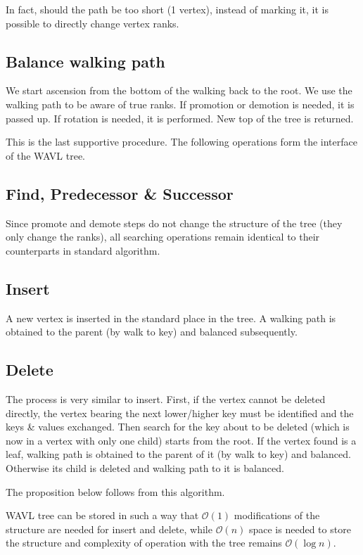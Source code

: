 In fact, should the path be too short (1 vertex), instead of marking it, it is possible to directly change vertex ranks.

\subsection{Balance walking path}

We start ascension from the bottom of the walking back to the root. We use the walking path to be aware of true ranks. If promotion or demotion is needed, it is passed up. If rotation is needed, it is performed. New top of the tree is returned. 

This is the last supportive procedure. The following operations form the interface of the WAVL tree.

\subsection{Find, Predecessor \& Successor}

Since promote and demote steps do not change the structure of the tree (they only change the ranks), all searching operations remain identical to their counterparts in standard algorithm.

\subsection{Insert}

A new vertex is inserted in the standard place in the tree. A walking path is obtained to the parent (by walk to key) and balanced subsequently.

\subsection{Delete}

The process is very similar to insert. First, if the vertex cannot be deleted directly, the vertex bearing the next lower/higher key must be identified and the keys \& values exchanged. Then search for the key about to be deleted (which is now in a vertex with only one child) starts from the root. If the vertex found is a leaf, walking path is obtained to the parent of it (by walk to key) and balanced. Otherwise its child is deleted and walking path to it is balanced.

The proposition below follows from this algorithm.

\begin{prop}
WAVL tree can be stored in such a way that $\mathcal{O}(1)$ modifications of the structure are needed for insert and delete, while $\mathcal{O}(n)$ space is needed to store the structure and complexity of operation with the tree remains $\mathcal{O}(\log n)$.
\end{prop}

